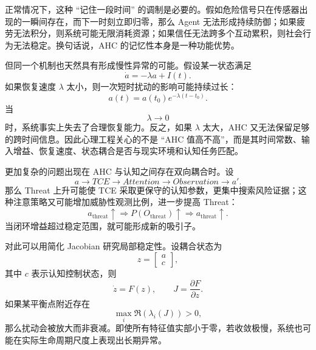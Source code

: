 正常情况下，这种 ``记住一段时间'' 的调制是必要的。假如危险信号只在传感器出现的一瞬间存在，而下一时刻立即归零，那么 Agent 无法形成持续防御；如果疲劳无法积分，则系统可能无限消耗资源；如果信任无法跨多个互动累积，则社会行为无法稳定。换句话说，AHC 的记忆性本身是一种功能优势。

但同一个机制也天然具有形成慢性异常的可能。假设某一状态满足
\begin{equation}
    \dot a
    =
    -\lambda a
    +
    I(t).
\end{equation}
如果恢复速度 $\lambda$ 太小，则一次短时扰动的影响可能持续过长：
\begin{equation}
    a(t)
    =
    a(t_0)e^{-\lambda(t-t_0)}.
\end{equation}
当
\begin{equation}
    \lambda\rightarrow 0
\end{equation}
时，系统事实上失去了合理恢复能力。反之，如果 $\lambda$ 太大，AHC 又无法保留足够的跨时间信息。因此心理工程关心的不是 ``AHC 值高不高''，而是其时间常数、输入增益、恢复速度、状态耦合是否与现实环境和认知任务匹配。

更加复杂的问题出现在 AHC 与认知之间存在双向耦合时。设
\begin{equation}
    a
    \rightarrow
    TCE
    \rightarrow
    Attention
    \rightarrow
    Observation
    \rightarrow
    a'.
\end{equation}
那么 Threat 上升可能使 TCE 采取更保守的认知参数，更集中搜索风险证据；这种注意策略又可能增加威胁性观测比例，进一步提高 Threat：
\begin{equation}
    a_{\mathrm{threat}}
    \uparrow
    \Rightarrow
    P(O_{\mathrm{threat}})
    \uparrow
    \Rightarrow
    a_{\mathrm{threat}}
    \uparrow.
\end{equation}
当闭环增益超过稳定范围，就可能形成新的吸引子。

对此可以用简化 Jacobian 研究局部稳定性。设耦合状态为
\begin{equation}
    z=
    \begin{bmatrix}
    a\\
    c
    \end{bmatrix},
\end{equation}
其中 $c$ 表示认知控制状态，则
\begin{equation}
    \dot z
    =
    F(z),
    \qquad
    J=
    \frac{\partial F}{\partial z}.
\end{equation}
如果某平衡点附近存在
\begin{equation}
    \max_i\Re(\lambda_i(J))>0,
\end{equation}
那么扰动会被放大而非衰减。即使所有特征值实部小于零，若收敛极慢，系统也可能在实际生命周期尺度上表现出长期异常。

